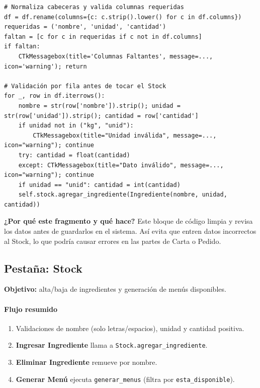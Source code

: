 \documentclass[12pt,a4paper]{article}
\begin{document}
\begin{tcolorbox}[colback=yellow!6,colframe=yellow!50!black,title=Highlight de código — Carga (\texttt{cargar\_csv} y \texttt{agregar\_csv\_al\_stock})]
\lstset{style=pyclean}
\begin{lstlisting}
# Normaliza cabeceras y valida columnas requeridas
df = df.rename(columns={c: c.strip().lower() for c in df.columns})
requeridas = ('nombre', 'unidad', 'cantidad')
faltan = [c for c in requeridas if c not in df.columns]
if faltan:
    CTkMessagebox(title='Columnas Faltantes', message=..., icon='warning'); return

# Validación por fila antes de tocar el Stock
for _, row in df.iterrows():
    nombre = str(row['nombre']).strip(); unidad = str(row['unidad']).strip(); cantidad = row['cantidad']
    if unidad not in ("kg", "unid"):
        CTkMessagebox(title="Unidad inválida", message=..., icon="warning"); continue
    try: cantidad = float(cantidad)
    except: CTkMessagebox(title="Dato inválido", message=..., icon="warning"); continue
    if unidad == "unid": cantidad = int(cantidad)
    self.stock.agregar_ingrediente(Ingrediente(nombre, unidad, cantidad))
\end{lstlisting}
\textbf{¿Por qué este fragmento y qué hace?} Este bloque de código limpia y revisa los datos antes de guardarlos en el sistema. Así evita que entren datos incorrectos al Stock, lo que podría causar errores en las partes de Carta o Pedido.
\end{tcolorbox}
\newpage

\subsection{Pestaña: Stock}
\textbf{Objetivo:} alta/baja de ingredientes y generación de menús disponibles.

\paragraph{Flujo resumido}
\begin{enumerate}[leftmargin=*]
  \item Validaciones de nombre (solo letras/espacios), unidad y cantidad positiva.
  \item \textbf{Ingresar Ingrediente} llama a \texttt{Stock.agregar\_ingrediente}.
  \item \textbf{Eliminar Ingrediente} remueve por nombre.
  \item \textbf{Generar Menú} ejecuta \texttt{generar\_menus} (filtra por \texttt{esta\_disponible}).
\end{enumerate}
\end{document}
